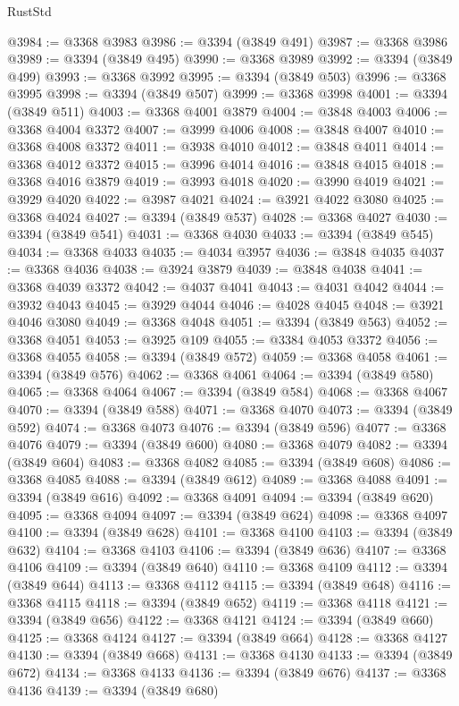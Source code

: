 \begin{lexlean}{RustStd}
\begin{coremodule}
@3984 := @3368 @3983
@3986 := @3394 (@3849 @491)
@3987 := @3368 @3986
@3989 := @3394 (@3849 @495)
@3990 := @3368 @3989
@3992 := @3394 (@3849 @499)
@3993 := @3368 @3992
@3995 := @3394 (@3849 @503)
@3996 := @3368 @3995
@3998 := @3394 (@3849 @507)
@3999 := @3368 @3998
@4001 := @3394 (@3849 @511)
@4003 := @3368 @4001 @3879
@4004 := @3848 @4003
@4006 := @3368 @4004 @3372
@4007 := @3999 @4006
@4008 := @3848 @4007
@4010 := @3368 @4008 @3372
@4011 := @3938 @4010
@4012 := @3848 @4011
@4014 := @3368 @4012 @3372
@4015 := @3996 @4014
@4016 := @3848 @4015
@4018 := @3368 @4016 @3879
@4019 := @3993 @4018
@4020 := @3990 @4019
@4021 := @3929 @4020
@4022 := @3987 @4021
@4024 := @3921 @4022 @3080
@4025 := @3368 @4024
@4027 := @3394 (@3849 @537)
@4028 := @3368 @4027
@4030 := @3394 (@3849 @541)
@4031 := @3368 @4030
@4033 := @3394 (@3849 @545)
@4034 := @3368 @4033
@4035 := @4034 @3957
@4036 := @3848 @4035
@4037 := @3368 @4036
@4038 := @3924 @3879
@4039 := @3848 @4038
@4041 := @3368 @4039 @3372
@4042 := @4037 @4041
@4043 := @4031 @4042
@4044 := @3932 @4043
@4045 := @3929 @4044
@4046 := @4028 @4045
@4048 := @3921 @4046 @3080
@4049 := @3368 @4048
@4051 := @3394 (@3849 @563)
@4052 := @3368 @4051
@4053 := @3925 @109
@4055 := @3384 @4053 @3372
@4056 := @3368 @4055
@4058 := @3394 (@3849 @572)
@4059 := @3368 @4058
@4061 := @3394 (@3849 @576)
@4062 := @3368 @4061
@4064 := @3394 (@3849 @580)
@4065 := @3368 @4064
@4067 := @3394 (@3849 @584)
@4068 := @3368 @4067
@4070 := @3394 (@3849 @588)
@4071 := @3368 @4070
@4073 := @3394 (@3849 @592)
@4074 := @3368 @4073
@4076 := @3394 (@3849 @596)
@4077 := @3368 @4076
@4079 := @3394 (@3849 @600)
@4080 := @3368 @4079
@4082 := @3394 (@3849 @604)
@4083 := @3368 @4082
@4085 := @3394 (@3849 @608)
@4086 := @3368 @4085
@4088 := @3394 (@3849 @612)
@4089 := @3368 @4088
@4091 := @3394 (@3849 @616)
@4092 := @3368 @4091
@4094 := @3394 (@3849 @620)
@4095 := @3368 @4094
@4097 := @3394 (@3849 @624)
@4098 := @3368 @4097
@4100 := @3394 (@3849 @628)
@4101 := @3368 @4100
@4103 := @3394 (@3849 @632)
@4104 := @3368 @4103
@4106 := @3394 (@3849 @636)
@4107 := @3368 @4106
@4109 := @3394 (@3849 @640)
@4110 := @3368 @4109
@4112 := @3394 (@3849 @644)
@4113 := @3368 @4112
@4115 := @3394 (@3849 @648)
@4116 := @3368 @4115
@4118 := @3394 (@3849 @652)
@4119 := @3368 @4118
@4121 := @3394 (@3849 @656)
@4122 := @3368 @4121
@4124 := @3394 (@3849 @660)
@4125 := @3368 @4124
@4127 := @3394 (@3849 @664)
@4128 := @3368 @4127
@4130 := @3394 (@3849 @668)
@4131 := @3368 @4130
@4133 := @3394 (@3849 @672)
@4134 := @3368 @4133
@4136 := @3394 (@3849 @676)
@4137 := @3368 @4136
@4139 := @3394 (@3849 @680)

\end{coremodule}
\end{lexlean}
